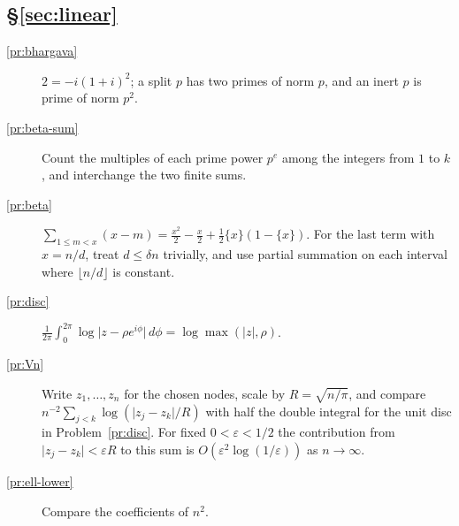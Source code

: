 \documentclass[reqno]{amsart}
\theoremstyle{definition}
\theoremstyle{plain}
\begin{document}
\subsection*{\S\ref{sec:linear}}
\begin{description}
\item[\ref{pr:bhargava}] \(2 = -i(1 + i)^2\); a split \(p\) has two primes of norm \(p\), and an inert \(p\) is prime of norm \(p^2\).
\item[\ref{pr:beta-sum}] Count the multiples of each prime power \(p^e\) among the integers from \(1\) to \(k\), and interchange the two finite sums.
\item[\ref{pr:beta}] \(\sum_{1 \le m < x} (x - m) = \frac{x^2}2 - \frac x2 + \frac12 \{x\}(1 - \{x\})\).  For the last term with \(x = n/d\), treat \(d \le \delta n\) trivially, and use partial summation on each interval where \(\lfloor n/d \rfloor\) is constant.
\item[\ref{pr:disc}] \(\frac1{2\pi}\int_0^{2\pi} \log\lvert z - \rho e^{i\phi} \rvert \, d\phi = \log\max(\lvert z \rvert, \rho)\).
\item[\ref{pr:Vn}] Write \(z_1,\dots,z_n\) for the chosen nodes, scale by \(R=\sqrt{n/\pi}\), and compare \(n^{-2}\sum_{j<k}\log(\lvert z_j-z_k\rvert/R)\) with half the double integral for the unit disc in Problem~\ref{pr:disc}.  For fixed \(0<\varepsilon<1/2\) the contribution from \(\lvert z_j-z_k\rvert<\varepsilon R\) to this sum is \(O(\varepsilon^2\log(1/\varepsilon))\) as \(n\to\infty\).
\item[\ref{pr:ell-lower}] Compare the coefficients of \(n^2\).
\end{description}
\end{document}
